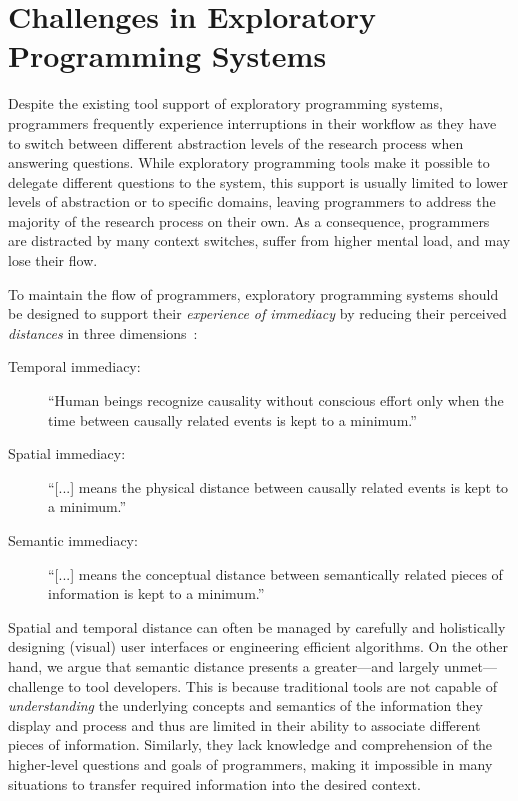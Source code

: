 
\section{Challenges in Exploratory Programming Systems}
\label{sec:background/challenges}

Despite the existing tool support of exploratory programming systems, programmers frequently experience interruptions in their workflow as they have to switch between different abstraction levels of the research process when answering questions.
While exploratory programming tools make it possible to delegate different questions to the system, this support is usually limited to lower levels of abstraction or to specific domains, leaving programmers to address the majority of the research process on their own.
As a consequence, programmers are distracted by many context switches, suffer from higher mental load, and may lose their flow.

To maintain the flow of programmers, exploratory programming systems should be designed to support their \emph{experience of immediacy} by reducing their perceived \emph{distances} in three dimensions~\cite{ungar1997debugging}:

\begin{description}
	\item[Temporal immediacy:] ``Human beings recognize causality without conscious effort only when the time between causally related events is kept to a minimum.''
	\item[Spatial immediacy:] ``[...] means the physical distance between causally related events is kept to a minimum.''
	\item[Semantic immediacy:] ``[...] means the conceptual distance between semantically related pieces of information is kept to a minimum.''
\end{description}

Spatial and temporal distance can often be managed by carefully and holistically designing (visual) user interfaces or engineering efficient algorithms.
On the other hand, we argue that semantic distance presents a greater---and largely unmet---challenge to tool developers.
This is because traditional tools are not capable of \emph{understanding} the underlying concepts and semantics of the information they display and process and thus are limited in their ability to associate different pieces of information.
Similarly, they lack knowledge and comprehension of the higher-level questions and goals of programmers, making it impossible in many situations to transfer required information into the desired context.

